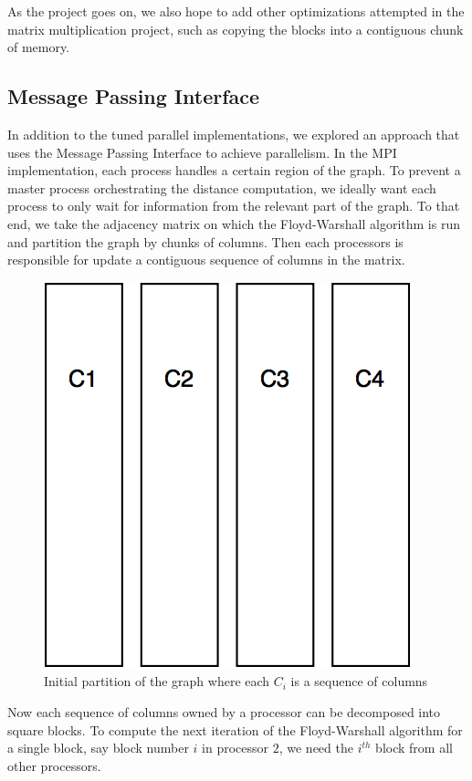 \documentclass[11pt]{article}
\begin{document}
As the project goes on, we also hope to add other optimizations attempted in the matrix multiplication project, such as copying the blocks into a contiguous chunk of memory.

\subsection{Message Passing Interface}\label{sec:mpi}

In addition to the tuned parallel implementations, we explored an approach that uses the Message Passing Interface to achieve parallelism. In the MPI implementation, each process handles a certain region of the graph. To prevent a master process orchestrating the distance computation, we ideally want each process to only wait for information from the relevant part of the graph. To that end, we take the adjacency matrix on which the Floyd-Warshall algorithm is run and partition the graph by chunks of columns. Then each processors is responsible for update a contiguous sequence of columns in the matrix.

\begin{figure}[H]
\centering
\includegraphics[scale=0.25]{initial_partition.png}
\caption{Initial partition of the graph where each $C_i$ is a sequence of columns}
\label{fig:init_part}
\end{figure}

Now each sequence of columns owned by a processor can be decomposed into square blocks. To compute the next iteration of the Floyd-Warshall algorithm for a single block, say block number $i$ in processor $2$, we need the $i^{th}$ block from all other processors.
\end{document}
